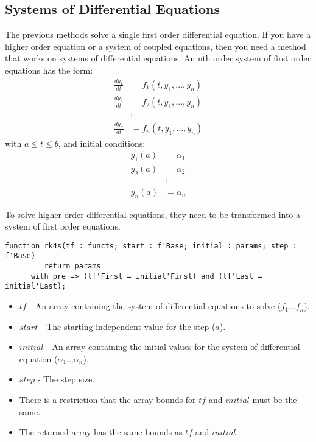 \documentclass[10pt, openany]{book}
\begin{document}
\subsection{Systems of Differential Equations}
The previous methods solve a single first order differential equation.  If you have a higher order equation or a system of coupled equations, then you need a method that works on systems of differential equations.  An nth order system of first order equations has the form:
\begin{align*}
  \frac{dy_1}{dt} &= f_1(t, y_1, ..., y_n) \\
  \frac{dy_2}{dt} &= f_2(t, y_1, ..., y_n) \\
  &\vdots\\
  \frac{dy_n}{dt} &= f_n(t, y_1, ..., y_n)
\end{align*}
with $a\leq t\leq b$, and initial conditions:
\begin{align*}
  y_1(a) &= \alpha_1 \\
  y_2(a) &= \alpha_2 \\
  &\vdots \\
  y_n(a) &= \alpha_n
\end{align*}

To solve higher order differential equations, they need to be transformed into a system of first order equations.

\begin{lstlisting}
function rk4s(tf : functs; start : f'Base; initial : params; step : f'Base)
         return params
      with pre => (tf'First = initial'First) and (tf'Last = initial'Last);
\end{lstlisting}
\begin{itemize}
  \item $tf$ - An array containing the system of differential equations to solve ($f_1 ... f_n$).
  \item $start$ - The starting independent value for the step ($a$).
  \item $initial$ - An array containing the initial values for the system of differential equation ($\alpha_1 ... \alpha_n$).
  \item $step$ - The step size.
  \item There is a restriction that the array bounds for $tf$ and $initial$ must be the same.
  \item The returned array has the same bounds as $tf$ and $initial$.
\end{itemize}

\end{document}
